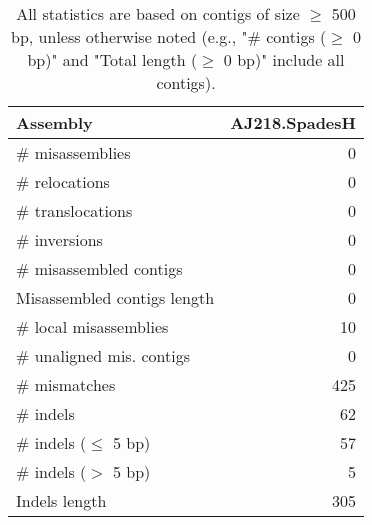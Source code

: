 \documentclass[12pt,a4paper]{article}
\begin{document}
\begin{table}[ht]
\begin{center}
\caption{All statistics are based on contigs of size $\geq$ 500 bp, unless otherwise noted (e.g., "\# contigs ($\geq$ 0 bp)" and "Total length ($\geq$ 0 bp)" include all contigs).}
\begin{tabular}{|l*{1}{|r}|}
\hline
Assembly & AJ218.SpadesH \\ \hline
\# misassemblies & 0 \\ \hline
\hspace{5mm}\# relocations & 0 \\ \hline
\hspace{5mm}\# translocations & 0 \\ \hline
\hspace{5mm}\# inversions & 0 \\ \hline
\# misassembled contigs & 0 \\ \hline
Misassembled contigs length & 0 \\ \hline
\# local misassemblies & 10 \\ \hline
\# unaligned mis. contigs & 0 \\ \hline
\# mismatches & 425 \\ \hline
\# indels & 62 \\ \hline
\hspace{5mm}\# indels ($\leq$ 5 bp) & 57 \\ \hline
\hspace{5mm}\# indels ($>$ 5 bp) & 5 \\ \hline
Indels length & 305 \\ \hline
\end{tabular}
\end{center}
\end{table}
\end{document}
